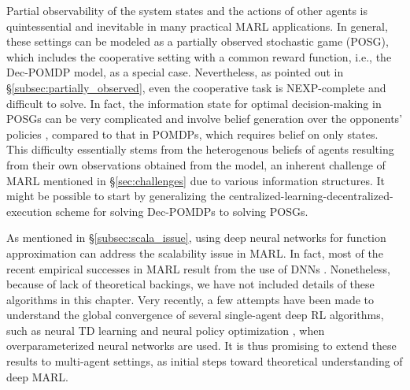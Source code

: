 \vspace{6pt}
\vspace{3pt} 
Partial observability of the system states and the actions of other agents is quintessential and inevitable in many practical MARL applications. In general, these settings can be modeled as a partially observed stochastic game (POSG), which includes the cooperative setting with a common reward function, i.e., the Dec-POMDP model, as a special case. Nevertheless, as pointed out in \S\ref{subsec:partially_observed}, even the cooperative task is NEXP-complete  \cite{bernstein2002complexity} and difficult to solve. In fact, the information state for optimal decision-making in POSGs can be  very complicated  and involve  belief generation over the opponents' policies 
\cite{hansen2004dynamic}, compared to that  in POMDPs, which requires belief on only states. This difficulty essentially stems  from the heterogenous beliefs of agents  resulting from their own observations obtained from the model, 
an inherent challenge of MARL  mentioned  in \S\ref{sec:challenges} due to various information structures. It might be possible to start by  generalizing the centralized-learning-decentralized-execution scheme for solving Dec-POMDPs \cite{amato2015scalable,dibangoye2018learning} to solving POSGs. 

\vspace{6pt}
\vspace{3pt} 
As mentioned in \S\ref{subsec:scala_issue}, using deep neural networks for function approximation can address the scalability issue in MARL. In fact, most of the recent empirical successes in MARL result from the use of DNNs \cite{heinrich2016deep,lowe2017multi,foerster2017counterfactual,gupta2017cooperative,omidshafiei2017deep}. Nonetheless, because of  lack of theoretical backings, we have not included details of these algorithms in this chapter. Very recently, a few attempts have been made to understand the global convergence of several single-agent deep RL algorithms, such as  neural TD learning \cite{cai2019neural} and  neural policy optimization  \cite{wang2019neural,liu2019neural},  when overparameterized neural networks \cite{arora2018optimization,li2018learning} are used. It is thus promising to extend these results to multi-agent  settings, as initial steps toward theoretical understanding of deep MARL. 

